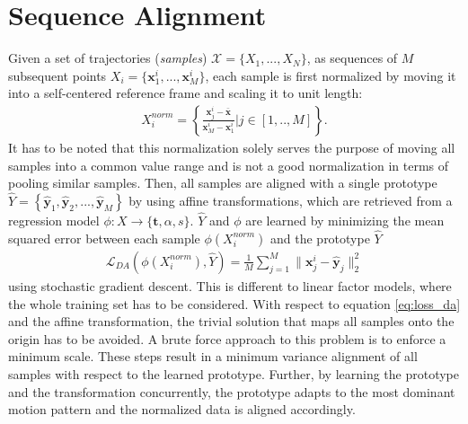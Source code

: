 \documentclass[letterpaper, 10 pt, conference]{ieeeconf}  %
\begin{document}
\section{Sequence Alignment}
\label{sec:da}
Given a set of trajectories (\emph{samples}) $\mathcal{X} = \{X_1, ..., X_N\}$, as sequences of $M$ subsequent points $X_i = \{\mathbf{x}^i_1, ..., \mathbf{x}^i_M\}$, each sample is first normalized by moving it into a self-centered reference frame and scaling it to unit length:
\begin{align}
	X^{norm}_i = \left\{\frac{\mathbf{x}^i_j - \bar{\mathbf{x}}}{\mathbf{x}^i_M - \mathbf{x}^i_1} | j \in [1,..,M] \right\}.
\end{align}
It has to be noted that this normalization solely serves the purpose of moving all samples into a common value range and is not a good normalization in terms of pooling similar samples. %
Then, all samples are aligned with a single prototype $\hat{Y} = \left\{\mathbf{\hat{y}}_1, \mathbf{\hat{y}}_2, ..., \mathbf{\hat{y}}_M \right\}$ by using affine transformations, which are retrieved from a regression model $\phi: X \rightarrow \{\mathbf{t},\alpha,s\}$.
$\hat{Y}$ and $\phi$ are learned by minimizing the mean squared error between each sample $\phi(X^{norm}_i)$ and the prototype $\hat{Y}$
\begin{align}
\label{eq:loss_da}
	\mathcal{L}_{DA}(\phi(X^{norm}_i), \hat{Y}) = \frac{1}{M} \sum^M_{j=1} \|\mathbf{x}^i_j - \mathbf{\hat{y}}_j\|^2_2
\end{align}
using stochastic gradient descent.
This is different to linear factor models, where the whole training set has to be considered.
With respect to equation \ref{eq:loss_da} and the affine transformation, the trivial solution that maps all samples onto the origin has to be avoided.
A brute force approach to this problem is to enforce a minimum scale. 
These steps result in a minimum variance alignment of all samples with respect to the learned prototype.
Further, by learning the prototype and the transformation concurrently, the prototype adapts to the most dominant motion pattern and the normalized data is aligned accordingly. 
\end{document}
